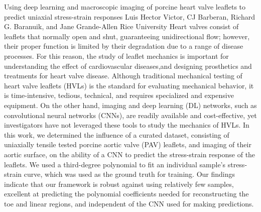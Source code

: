 \begin{addmargin}[2em]{0em}
\vspace{1.5ex}
\abs
{Using deep learning and macroscopic imaging of porcine heart valve leaflets to predict uniaxial stress-strain responses}
{Luis Hector Victor, CJ Barberan, Richard G. Baranuik, and Jane Grande-Allen}
{Rice University}
{Heart valves consist of leaflets that normally open and shut, guaranteeing unidirectional flow; however, their proper function is limited by their degradation due to a range of disease processes. For this reason, the study of leaflet mechanics is important for understanding the effect of cardiovascular diseases,and designing prosthetics and treatments for heart valve disease. Although traditional mechanical testing of heart valve leaflets (HVLs) is the standard for evaluating mechanical behavior, it is time-intensive, tedious, technical, and requires specialized and expensive equipment. On the other hand, imaging and deep learning (DL) networks, such as convolutional neural networks (CNNs), are readily available and cost-effective, yet investigators have not leveraged these tools to study the mechanics of HVLs. In this work, we determined the influence of a curated dataset, consisting of uniaxially tensile tested porcine aortic valve (PAV) leaflets, and imaging of their aortic surface, on the ability of a CNN to predict the stress-strain response of the leaflets. We used a third-degree polynomial to fit an individual sample's stress-strain curve, which was used as the ground truth for training. Our findings indicate that our framework is robust against using relatively few samples, excellent at predicting the polynomial coefficients needed for reconstructing the toe and linear regions, and independent of the CNN used for making predictions.}

\end{addmargin}
